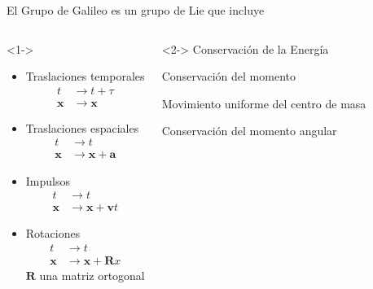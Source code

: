 \documentclass[%
xcolor=pdftex,dvipsnames,table%
]{beamer}
\begin{document}
\begin{frame}[plain]
    El Grupo de Galileo es un grupo de Lie que incluye
    \begin{columns}
      \begin{block}<1->{}
              \begin{itemize}
      \item Traslaciones temporales
\vspace{-0.3cm}
      \begin{align*}
        t&\to t+\tau\\
        \mathbf{x}&\to \mathbf{x}
      \end{align*}

\vspace{-0.3cm}
    \item Traslaciones espaciales
\vspace{-0.3cm}
      \begin{align*}
        t&\to t\\
        \mathbf{x}&\to \mathbf{x}+\mathbf{a}
      \end{align*}

\vspace{-0.3cm}
    \item Impulsos
\vspace{-0.3cm}
      \begin{align*}
        t&\to t\\
        \mathbf{x}&\to \mathbf{x}+\mathbf{v}t
      \end{align*}

\vspace{-0.3cm}
    \item Rotaciones
\vspace{-0.3cm}
      \begin{align*}
        t&\to t\\
        \mathbf{x}&\to \mathbf{x}+\mathbf{R}x
      \end{align*}
    $\mathbf{R}$ una matriz ortogonal
    \end{itemize}
      \end{block}
\begin{block}<2->{}
Conservación de la Energía

\vspace{1cm}

  Conservación del momento

\vspace{1.3cm}

Movimiento uniforme del centro de masa
\vspace{1cm}

Conservación del momento angular

\vspace{1cm}
\qquad
\end{block}
    \end{columns}
\end{frame}
\end{document}
